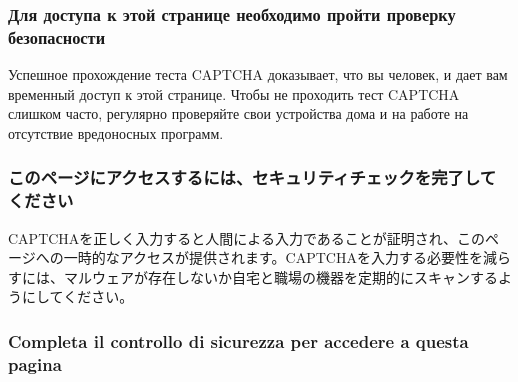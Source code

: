 \hypertarget{ux434ux43bux44f-ux434ux43eux441ux442ux443ux43fux430-ux43a-ux44dux442ux43eux439-ux441ux442ux440ux430ux43dux438ux446ux435-ux43dux435ux43eux431ux445ux43eux434ux438ux43cux43e-ux43fux440ux43eux439ux442ux438-ux43fux440ux43eux432ux435ux440ux43aux443-ux431ux435ux437ux43eux43fux430ux441ux43dux43eux441ux442ux438}{%
\subsubsection{Для доступа к этой странице необходимо пройти проверку
безопасности}\label{ux434ux43bux44f-ux434ux43eux441ux442ux443ux43fux430-ux43a-ux44dux442ux43eux439-ux441ux442ux440ux430ux43dux438ux446ux435-ux43dux435ux43eux431ux445ux43eux434ux438ux43cux43e-ux43fux440ux43eux439ux442ux438-ux43fux440ux43eux432ux435ux440ux43aux443-ux431ux435ux437ux43eux43fux430ux441ux43dux43eux441ux442ux438}}

Успешное прохождение теста CAPTCHA доказывает, что вы человек, и дает
вам временный доступ к этой странице. Чтобы не проходить тест CAPTCHA
слишком часто, регулярно проверяйте свои устройства дома и на работе на
отсутствие вредоносных программ.

\hypertarget{ux3053ux306eux30daux30fcux30b8ux306bux30a2ux30afux30bbux30b9ux3059ux308bux306bux306fux30bbux30adux30e5ux30eaux30c6ux30a3ux30c1ux30a7ux30c3ux30afux3092ux5b8cux4e86ux3057ux3066ux304fux3060ux3055ux3044}{%
\subsubsection{このページにアクセスするには、セキュリティチェックを完了してください}\label{ux3053ux306eux30daux30fcux30b8ux306bux30a2ux30afux30bbux30b9ux3059ux308bux306bux306fux30bbux30adux30e5ux30eaux30c6ux30a3ux30c1ux30a7ux30c3ux30afux3092ux5b8cux4e86ux3057ux3066ux304fux3060ux3055ux3044}}

CAPTCHAを正しく入力すると人間による入力であることが証明され、このページへの一時的なアクセスが提供されます。CAPTCHAを入力する必要性を減らすには、マルウェアが存在しないか自宅と職場の機器を定期的にスキャンするようにしてください。

\hypertarget{completa-il-controllo-di-sicurezza-per-accedere-a-questa-pagina}{%
\subsubsection{Completa il controllo di sicurezza per accedere a questa
pagina}\label{completa-il-controllo-di-sicurezza-per-accedere-a-questa-pagina}}

